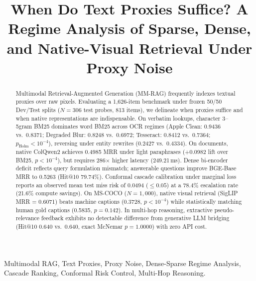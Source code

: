 \documentclass[conference]{IEEEtran}
\begin{document}
\title{When Do Text Proxies Suffice? A Regime Analysis of Sparse, Dense, and Native-Visual Retrieval Under Proxy Noise}

\author{
}

\maketitle

\begin{abstract}
Multimodal Retrieval-Augmented Generation (MM-RAG) frequently indexes textual proxies over raw pixels. Evaluating a 1,626-item benchmark under frozen 50/50 Dev/Test splits ($N=306$ test probes, 813 items), we delineate when proxies suffice and when native representations are indispensable. On verbatim lookups, character 3--5gram BM25 dominates word BM25 across OCR regimes (Apple Clean: 0.9436 vs.\ 0.8371; Degraded Blur: 0.8248 vs.\ 0.6972; Tesseract: 0.8412 vs.\ 0.7364; $p_{\text{Holm}} < 10^{-4}$), reversing under entity rewrites (0.2427 vs.\ 0.4334). On documents, native ColQwen2 achieves 0.4985 MRR under light paraphrases (+0.0982 lift over BM25, $p < 10^{-4}$), but requires 286$\times$ higher latency (249.21\,ms). Dense bi-encoder deficit reflects query formulation mismatch; answerable questions improve BGE-Base MRR to 0.5263 (Hit@10 79.74\%). Conformal cascade calibration under marginal loss reports an observed mean test miss risk of 0.0494 ($\le 0.05$) at a 78.4\% escalation rate (21.6\% compute savings). On MS-COCO ($N=1{,}000$), native visual retrieval (SigLIP MRR = 0.6071) beats machine captions (0.3728, $p < 10^{-4}$) while statistically matching human gold captions (0.5835, $p=0.142$). In multi-hop reasoning, extractive pseudo-relevance feedback exhibits no detectable difference from generative LLM bridging (Hit@10 0.640 vs.\ 0.640, exact McNemar $p = 1.0000$) with zero API cost.
\end{abstract}

\begin{IEEEkeywords}
Multimodal RAG, Text Proxies, Proxy Noise, Dense-Sparse Regime Analysis, Cascade Ranking, Conformal Risk Control, Multi-Hop Reasoning.
\end{IEEEkeywords}
\end{document}
